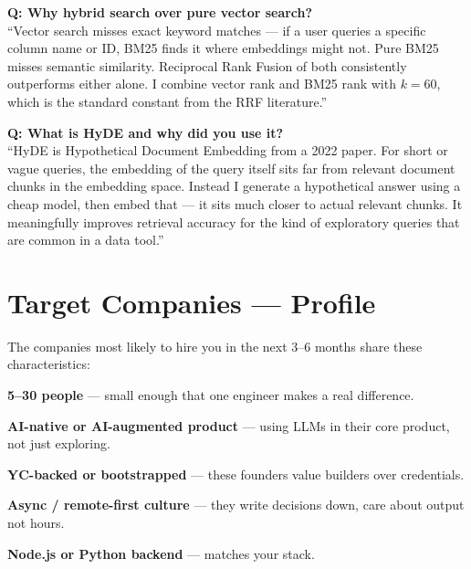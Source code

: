 \documentclass[11pt, a4paper]{article}
\begin{document}
\noindent\textbf{Q: Why hybrid search over pure vector search?}\\
``Vector search misses exact keyword matches — if a user queries a specific column name or ID, BM25 finds it where embeddings might not. Pure BM25 misses semantic similarity. Reciprocal Rank Fusion of both consistently outperforms either alone. I combine vector rank and BM25 rank with $k=60$, which is the standard constant from the RRF literature.''

\vspace{8pt}

\noindent\textbf{Q: What is HyDE and why did you use it?}\\
``HyDE is Hypothetical Document Embedding from a 2022 paper. For short or vague queries, the embedding of the query itself sits far from relevant document chunks in the embedding space. Instead I generate a hypothetical answer using a cheap model, then embed that — it sits much closer to actual relevant chunks. It meaningfully improves retrieval accuracy for the kind of exploratory queries that are common in a data tool.''

\section{Target Companies — Profile}

\noindent The companies most likely to hire you in the next 3--6 months share these characteristics:

\begin{checklist}
  \item \textbf{5--30 people} — small enough that one engineer makes a real difference.
  \item \textbf{AI-native or AI-augmented product} — using LLMs in their core product, not just exploring.
  \item \textbf{YC-backed or bootstrapped} — these founders value builders over credentials.
  \item \textbf{Async / remote-first culture} — they write decisions down, care about output not hours.
  \item \textbf{Node.js or Python backend} — matches your stack.
\end{checklist}

\vspace{6pt}
\end{document}
